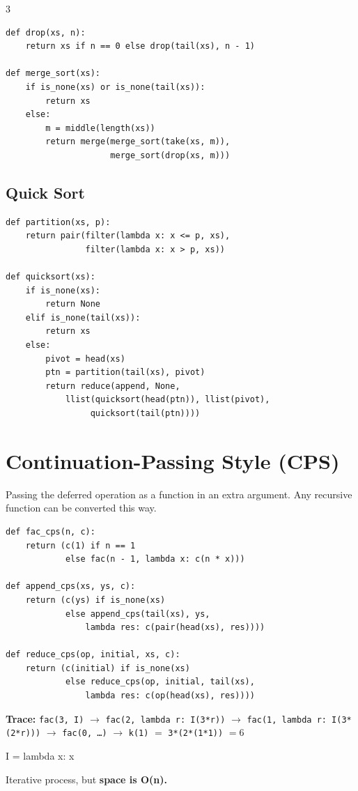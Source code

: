 \documentclass[9pt,landscape]{extarticle}
\newcommand{\kw}[1]{\textcolor{kw}{\texttt{#1}}}
\begin{document}
\begin{multicols*}{3}
\begin{lstlisting}
def drop(xs, n):
    return xs if n == 0 else drop(tail(xs), n - 1)

def merge_sort(xs):
    if is_none(xs) or is_none(tail(xs)):
        return xs
    else:
        m = middle(length(xs))
        return merge(merge_sort(take(xs, m)),
                     merge_sort(drop(xs, m)))
\end{lstlisting}

\subsection*{Quick Sort}
\begin{lstlisting}
def partition(xs, p):
    return pair(filter(lambda x: x <= p, xs),
                filter(lambda x: x > p, xs))

def quicksort(xs):
    if is_none(xs):
        return None
    elif is_none(tail(xs)):
        return xs
    else:
        pivot = head(xs)
        ptn = partition(tail(xs), pivot)
        return reduce(append, None,
            llist(quicksort(head(ptn)), llist(pivot),
                 quicksort(tail(ptn))))
\end{lstlisting}

\section*{Continuation-Passing Style (CPS)}
Passing the deferred operation as a function in an extra argument. Any recursive function can be converted this way.

\begin{lstlisting}
def fac_cps(n, c):
    return (c(1) if n == 1
            else fac(n - 1, lambda x: c(n * x)))

def append_cps(xs, ys, c):
    return (c(ys) if is_none(xs)
            else append_cps(tail(xs), ys,
                lambda res: c(pair(head(xs), res))))

def reduce_cps(op, initial, xs, c):
    return (c(initial) if is_none(xs)
            else reduce_cps(op, initial, tail(xs),
                lambda res: c(op(head(xs), res))))

\end{lstlisting}

\textbf{Trace:} \kw{fac(3, I)} $\to$ \kw{fac(2, lambda r: I(3*r))} $\to$ \kw{fac(1, lambda r: I(3*(2*r)))} $\to$ \kw{fac(0, \dots)} $\to$ \kw{k(1)} $=$ \kw{3*(2*(1*1))} $=6$

\small{I = lambda x: x}

Iterative process, but \textbf{space is O(n).}

\end{multicols*}
\end{document}
